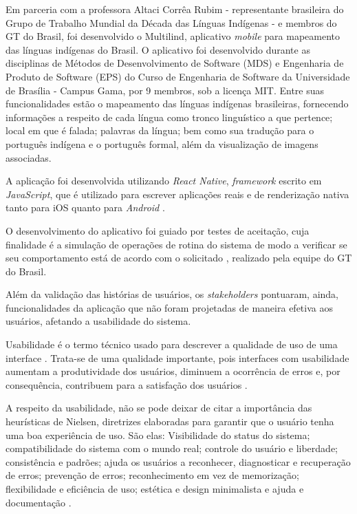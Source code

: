 Em parceria com a professora Altaci Corrêa Rubim - representante brasileira do Grupo de Trabalho Mundial da Década das Línguas Indígenas - e membros do GT do Brasil, foi
desenvolvido o Multilind, aplicativo \textit{mobile} para mapeamento das línguas indígenas do Brasil. O aplicativo foi desenvolvido durante as disciplinas de Métodos de
Desenvolvimento de Software (MDS) e Engenharia de Produto de Software (EPS) do Curso de Engenharia de Software da Universidade de Brasília - Campus Gama, por 9 membros,
sob a licença MIT. Entre suas funcionalidades estão o mapeamento das línguas indígenas brasileiras, fornecendo informações a respeito de cada língua como tronco
linguístico a que pertence; local em que é falada; palavras da língua; bem como sua tradução para o português indígena e o português formal, além da visualização de
imagens associadas.

A aplicação foi desenvolvida utilizando \textit{React Native}, \textit{framework} escrito em \textit{JavaScript}, que é utilizado para escrever aplicações reais e de
renderização nativa tanto para iOS quanto para \textit{Android} \cite{eiseman2017}.

O desenvolvimento do aplicativo foi guiado por testes de aceitação, cuja finalidade é a simulação de operações de rotina do sistema de modo a verificar se seu
comportamento está de acordo com o solicitado \cite{neto2015}, realizado pela equipe do GT do Brasil.

Além da validação das histórias de usuários, os \textit{stakeholders} pontuaram, ainda, funcionalidades da aplicação que não foram projetadas de maneira efetiva aos
usuários, afetando a usabilidade do sistema.

Usabilidade é o termo técnico usado para descrever a qualidade de uso de uma interface \cite{bevan1995}. Trata-se de uma qualidade importante, pois interfaces com
usabilidade aumentam a produtividade dos usuários, diminuem a ocorrência de erros e, por consequência, contribuem para a satisfação dos usuários \cite{winckler2022}.

A respeito da usabilidade, não se pode deixar de citar a importância das heurísticas de Nielsen, diretrizes elaboradas para garantir que o usuário tenha uma boa
experiência de uso. São elas: Visibilidade do status do sistema; compatibilidade do sistema com o mundo real; controle do usuário e liberdade; consistência e padrões;
ajuda os usuários a reconhecer, diagnosticar e recuperação de erros; prevenção de erros; reconhecimento em vez de memorização; flexibilidade e eficiência de uso; estética
e design minimalista e ajuda e documentação \cite{nielsen1994}.

